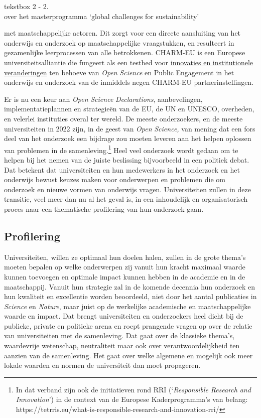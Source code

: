 \documentclass[smallauthor, chapterhaspagenum, nochapterinheader, pagenuminheader,  bigchapnum,medium2, tocpages, garamond, titleinheader]{jote-book}
\begin{document}
\begin{bookbox}{\raggedright tekstbox 2 - 2. \\over het masterprogramma ‘global challenges for sustainability’}
met maatschappelijke actoren. Dit zorgt voor een directe aansluiting van het onderwijs en onderzoek op maatschappelijke vraagstukken, en resulteert in gezamenlijke leerprocessen van alle betrokkenen. CHARM-EU is een Europese universiteitsalliantie die fungeert als een testbed voor \href{https://www.charm-eu.eu/torch}{innovaties en institutionele veranderingen} ten behoeve van \emph{Open }\emph{Science} en Public Engagement in het onderwijs en onderzoek van de inmiddels negen CHARM-EU partnerinstellingen.
	\end{bookbox}

	Er is nu een keur aan \emph{Open }\emph{Science} \emph{Declarations}, aanbevelingen, implementatieplannen en strategieën van de EU, de UN en UNESCO, overheden, en velerlei instituties overal ter wereld. De meeste onderzoekers, en de meeste universiteiten in 2022 zijn, in de geest van \emph{Open }\emph{Science}\emph{,} van mening dat een fors deel van het onderzoek een bijdrage zou moeten leveren aan het helpen oplossen van problemen in de samenleving.\footnote{In dat verband zijn ook de initiatieven rond RRI (‘\emph{Responsible}\emph{ Research }\emph{and}\emph{ }\emph{Innovation}') in de context van de Europese Kaderprogramma's van belang: https://tetrris.eu/what-is-responsible-research-and-innovation-rri/} Heel veel onderzoek wordt gedaan om te helpen bij het nemen van de juiste beslissing bijvoorbeeld in een politiek debat. Dat betekent dat universiteiten en hun medewerkers in het onderzoek en het onderwijs bewust keuzes maken voor onderwerpen en problemen die om onderzoek en nieuwe vormen van onderwijs vragen. Universiteiten zullen in deze transitie, veel meer dan nu al het geval is, in een inhoudelijk en organisatorisch proces naar een thematische profilering van hun onderzoek gaan.



	\subsection{Profilering}



	Universiteiten, willen ze optimaal hun doelen halen, zullen in de grote thema's moeten bepalen op welke onderwerpen zij vanuit hun kracht maximaal waarde kunnen toevoegen en optimale impact kunnen hebben in de academie en in de maatschappij. Vanuit hun strategie zal in de komende decennia hun onderzoek en hun kwaliteit en excellentie worden beoordeeld, niet door het aantal publicaties in \emph{Science} en \emph{Nature}, maar juist op de werkelijke academische en maatschappelijke waarde en impact. Dat brengt universiteiten en onderzoekers heel dicht bij de publieke, private en politieke arena en roept prangende vragen op over de relatie van universiteiten met de samenleving. Dat gaat over de klassieke thema's, waardevrije wetenschap, neutraliteit maar ook over verantwoordelijkheid ten aanzien van de samenleving. Het gaat over welke algemene en mogelijk ook meer lokale waarden en normen de universiteit dan moet propageren.
\end{document}
